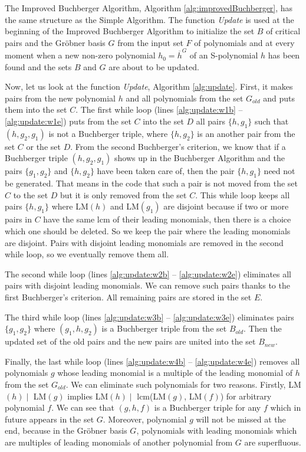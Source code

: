 The Improved Buchberger Algorithm, Algorithm \ref{alg:improvedBuchberger}, has the same structure as the Simple Algorithm. The function \textit{Update} is used at the beginning of the Improved Buchberger Algorithm to initialize the set $B$ of critical pairs and the Gr\"obner basis $G$ from the input set $F$ of polynomials and at every moment when a new non-zero polynomial $h_0 = \overline{h}^G$ of an S-polynomial $h$ has been found and the sets $B$ and $G$ are about to be updated.



Now, let us look at the function \textit{Update}, Algorithm \ref{alg:update}. First, it makes pairs from the new polynomial $h$ and all polynomials from the set $G_{old}$ and puts them into the set $C$. The first while loop (lines \ref{alg:update:w1b} -- \ref{alg:update:w1e}) puts from the set $C$ into the set $D$ all pairs $\{h, g_1\}$ such that $(h, g_2, g_1)$ is not a Buchberger triple, where $\{h, g_2\}$ is an another pair from the set $C$ or the set $D$. From the second Buchberger's criterion, we know that if a Buchberger triple $(h, g_2, g_1)$ shows up in the Buchberger Algorithm and the pairs $\{g_1, g_2\}$ and $\{h, g_2\}$ have been taken care of, then the pair $\{h, g_1\}$ need not be generated. That means in the code that such a pair is not moved from the set $C$ to the set $D$ but it is only removed from the set $C$. This while loop keeps all pairs $\{h, g_1\}$ where LM$(h)$ and LM$(g_1)$ are disjoint because if two or more pairs in $C$ have the same lcm of their leading monomials, then there is a choice which one should be deleted. So we keep the pair where the leading monomials are disjoint. Pairs with disjoint leading monomials are removed in the second while loop, so we eventually remove them all.

The second while loop (lines \ref{alg:update:w2b} -- \ref{alg:update:w2e}) eliminates all pairs with disjoint leading monomials. We can remove such pairs thanks to the first Buchberger's criterion. All remaining pairs are stored in the set $E$.

The third while loop (lines \ref{alg:update:w3b} -- \ref{alg:update:w3e}) eliminates pairs $\{g_1, g_2\}$ where $(g_1, h, g_2)$ is a Buchberger triple from the set $B_{old}$. Then the updated set of the old pairs and the new pairs are united into the set $B_{new}$.

Finally, the last while loop (lines \ref{alg:update:w4b} -- \ref{alg:update:w4e}) removes all polynomials $g$ whose leading monomial is a multiple of the leading monomial of $h$ from the set $G_{old}$. We can eliminate such polynomials for two reasons. Firstly, LM$(h) \mid$ LM$(g)$ implies LM$(h) \mid$ lcm(LM$(g)$, LM$(f)$) for arbitrary polynomial $f$. We can see that $(g, h, f)$ is a Buchberger triple for any $f$ which in future appears in the set $G$. Moreover, polynomial $g$ will not be missed at the end, because in the Gr\"obner basis $G$, polynomials with leading monomials which are multiples of leading monomials of another polynomial from $G$ are superfluous.

